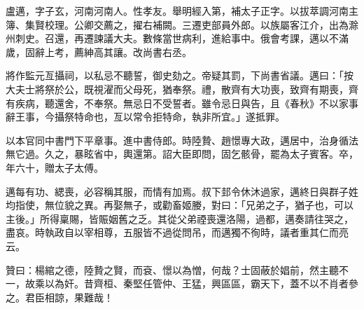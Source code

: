\begin{pinyinscope}
 盧邁，字子玄，河南河南人。性孝友。舉明經入第，補太子正字。以拔萃調河南主簿、集賢校理。公卿交薦之，擢右補闕。三遷吏部員外郎。以族屬客江介，出為滁州刺史。召還，再遷諫議大夫。數條當世病利，進給事中。俄會考課，邁以不滿歲，固辭上考，薦紳高其讓。改尚書右丞。



 將作監元亙攝祠，以私忌不聽誓，御史劾之。帝疑其罰，下尚書省議。邁曰：「按大夫士將祭於公，既視濯而父母死，猶奉祭。禮，散齊有大功喪，致齊有期喪，齊有疾病，聽還舍，不奉祭。無忌日不受誓者。雖令忌日與告，且《春秋》不以家事辭王事，今攝祭特命也，亙以常令拒特命，執非所宜。」遂抵罪。



 以本官同中書門下平章事。進中書侍郎。時陸贄、趙憬專大政，邁居中，治身循法無它過。久之，暴眩省中，輿還第。詔大臣即問，固乞骸骨，罷為太子賓客。卒，年六十，贈太子太傅。



 邁每有功、緦喪，必容稱其服，而情有加焉。叔下邽令休沐過家，邁終日與群子姓均指使，無位貌之異。再娶無子，或勸畜姬媵，對曰：「兄弟之子，猶子也，可以主後。」所得稟賜，皆賑姻舊之乏。其從父弟禋喪還洛陽，過都，邁奏請往哭之，盡哀。時執政自以宰相尊，五服皆不過從問吊，而邁獨不徇時，議者重其仁而亮云。



 贊曰：楊綰之德，陸贄之賢，而袞、憬以為憎，何哉？士固蔽於娼前，然主聽不一，故乘以為奸。昔齊桓、秦堅任管仲、王猛，興區區，霸天下，蓋不以不肖者參之。君臣相諒，果難哉！



\end{pinyinscope}